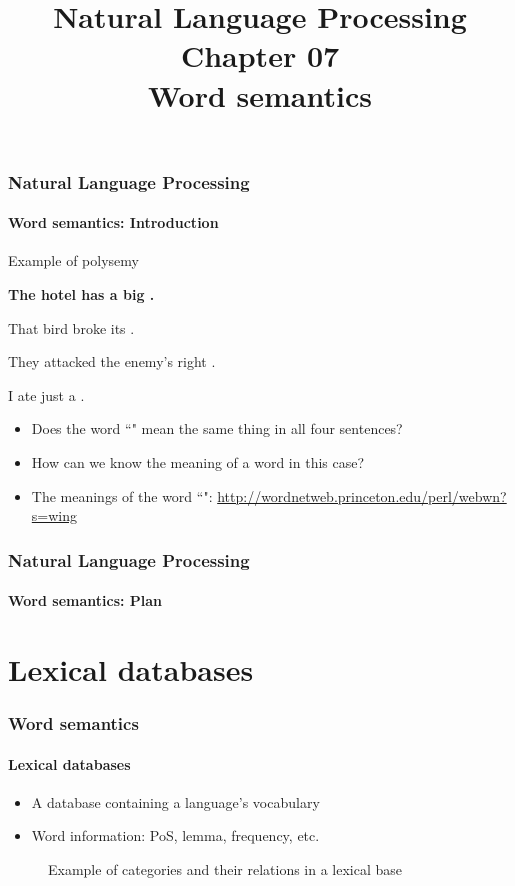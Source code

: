 \documentclass[xcolor=table]{beamer}
\title[ESI - NLP: 07- Word semantics]%
{Natural Language Processing\\Chapter 07\\Word semantics}
\begin{document}
	
\begin{frame}
\frametitle{Natural Language Processing}
\framesubtitle{Word semantics: Introduction}

\begin{exampleblock}{Example of polysemy}
	\begin{center}
		\Large\bfseries
			The hotel has a big .
			 
			That bird broke its .
			
			They attacked the enemy's right .
			
			I ate just a .
	\end{center}
\end{exampleblock}

\begin{itemize}
	\item Does the word ``" mean the same thing in all four sentences?
	\item How can we know the meaning of a word in this case?
	\item The meanings of the word ``": \url{http://wordnetweb.princeton.edu/perl/webwn?s=wing}
\end{itemize}

\end{frame}

\begin{frame}
\frametitle{Natural Language Processing}
\framesubtitle{Word semantics: Plan}

\begin{multicols}{2}
\tableofcontents
\end{multicols}
\end{frame}

\section{Lexical databases}

\begin{frame}
	\frametitle{Word semantics}
	\framesubtitle{Lexical databases}

	\begin{itemize}
		\item A database containing a language's vocabulary
		\item Word information: PoS, lemma, frequency, etc.
	\end{itemize}

	\begin{figure}
		\centering 
		\caption{Example of categories and their relations in a lexical base \cite{2019-white-al}}
	\end{figure}
	
\end{frame}
\end{document}
